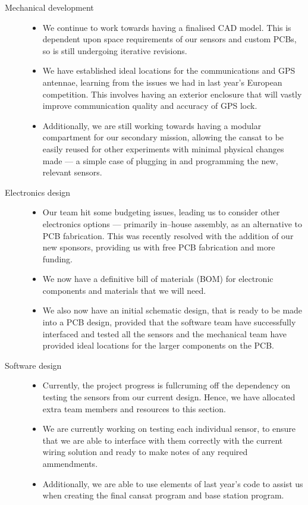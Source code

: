 \documentclass{report}
\begin{document}
\begin{description}
		\item[Mechanical development] \hfill \begin{itemize}
			\item We continue to work towards having a finalised 
			CAD model. This is dependent upon space requirements of
			our sensors and custom PCBs, so is still undergoing iterative
			revisions.
			\item We have established ideal locations for the communications 
			and GPS antennae, learning from the issues we had in last year's
			European competition. This involves having an exterior 
			enclosure that will vastly improve communication quality and
			accuracy of GPS lock.
			\item Additionally, we are still working towards having a modular
			compartment for our secondary mission, allowing the cansat to
			be easily reused for other experiments with minimal physical
			changes made --- a simple case of plugging in and programming
			the new, relevant sensors.
		\end{itemize}

		\item[Electronics design] \hfill \begin{itemize}
			\item Our team hit some budgeting issues, leading us to
			consider other electronics options --- primarily in--house 
			assembly, as an alternative to PCB fabrication. This was recently
			resolved with the addition of our new sponsors, providing us
			with free PCB fabrication and more funding.
			\item We now have a definitive bill of materials (BOM) for 
			electronic components and materials that we will need.
			\item We also now have an initial schematic design, that is 
			ready to be made into a PCB design, provided that the software
			team have successfully interfaced and tested all the sensors and
			the mechanical team have provided ideal locations for the larger
			components on the PCB.
		\end{itemize}

		\item[Software design] \hfill \begin{itemize}
			\item Currently, the project progress is fullcruming off the
			dependency on testing the sensors from our current design.
			Hence, we have allocated extra team members and 
			resources to this section.
			\item We are currently working on testing each individual sensor, 
			to ensure that we are able to interface with them correctly with
			the current wiring solution and ready to make notes of any required 
			ammendments.
			\item Additionally, we are able to use elements of last year's code
			to assist us when creating the final cansat program and base
			station program.
		\end{itemize}


\end{description}
\end{document}
